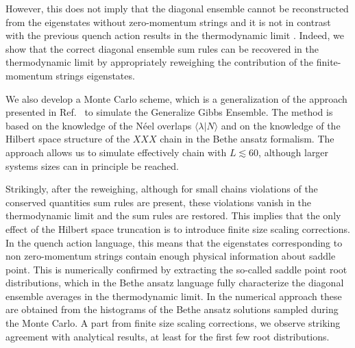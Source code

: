 \documentclass[11pt]{iopart}
\begin{document}
However, this does not imply that the diagonal ensemble cannot be reconstructed  
from the eigenstates without zero-momentum strings and it is not in contrast 
with the previous quench action results in the thermodynamic limit \cite{wouters-2014A,pozsgay-2014A}.
Indeed, we show  that the correct diagonal ensemble 
sum rules can be recovered in the thermodynamic limit by appropriately 
reweighing the contribution of the finite-momentum strings eigenstates.  

We also develop a Monte Carlo scheme, which is a generalization of 
the approach presented in Ref.~\cite{alba-2015} to simulate the Generalize 
Gibbs Ensemble. The method is based on the knowledge of the N\'eel overlaps 
$\langle\lambda|N\rangle$ and on the knowledge of the Hilbert space structure 
of the $XXX$ chain in the Bethe ansatz formalism. The approach allows us to 
simulate effectively chain with $L\lesssim 60$, although larger systems 
sizes can in principle be reached. 

Strikingly, after the reweighing, although for small chains violations of the conserved quantities 
sum rules are present, these violations vanish in the thermodynamic limit 
and the sum rules are restored. This implies that the only effect of the 
Hilbert space truncation is to introduce finite size scaling corrections. 
In the quench action language, this means that the eigenstates corresponding to non 
zero-momentum strings contain enough physical information about saddle point. 
This is numerically confirmed by extracting the so-called saddle point 
root distributions, which in the Bethe ansatz language fully characterize 
the diagonal ensemble averages in the thermodynamic limit. In the numerical  
 approach these are obtained from the histograms of the Bethe ansatz 
solutions sampled during the Monte Carlo. A part from finite size scaling 
corrections, we observe striking agreement with analytical results, at least 
for the first few root distributions. 






%
%
\end{document}
